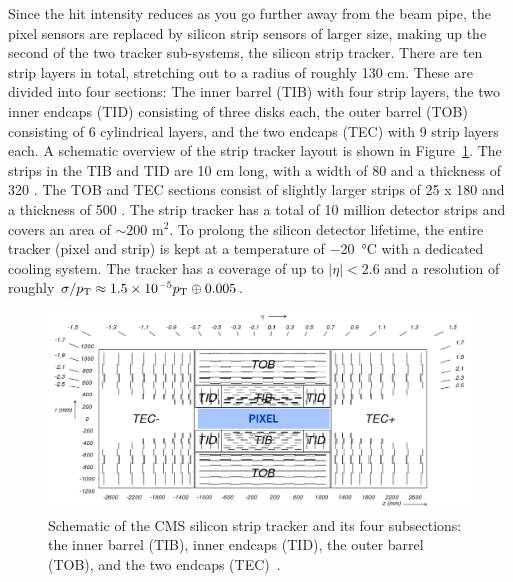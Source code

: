 Since the hit intensity reduces as you go further away from the beam pipe, the pixel sensors are replaced by silicon strip sensors of larger size, making up the second of the two tracker sub-systems, the silicon strip tracker. There are ten strip layers in total, stretching out to a radius of roughly 130 cm. These are divided into four sections: The inner barrel (TIB) with four strip layers, the two inner endcaps (TID) consisting of three disks each, the outer barrel (TOB) consisting of 6 cylindrical layers, and the two endcaps (TEC) with 9 strip layers each. A schematic overview of the strip tracker layout is shown in Figure~\ref{fig:cms:tracker}.
The strips in the TIB and TID are 10 cm long, with a width of 80 \micron and a thickness of 320 \micron. The TOB and TEC sections consist of slightly larger strips of 25 \cm x 180 \micron and a thickness of 500 \micron. The strip tracker has a total of 10 million detector strips and covers an area of $\sim 200 \textrm{ m}^2$.
To prolong the silicon detector lifetime, the entire tracker (pixel and strip) is kept at a temperature of \SI{-20}{\celsius} with a dedicated cooling system.
The tracker has a coverage of up to $|\eta|<2.6$ and a resolution of roughly $\sigma / p_{\mathrm{T}} \approx 1.5 \times 10^{-5} p_{\mathrm{T}} \oplus 0.005$.
\begin{figure}[h!] 
    \centering
    \includegraphics[width=1.0\textwidth]{figures/cms/fig_cmstracker.png}
    \caption{Schematic of the CMS silicon strip tracker and its four subsections: the inner barrel (TIB), inner endcaps (TID), the outer barrel (TOB), and the two endcaps (TEC)~\cite{Chatrchyan:2008aa}.}
    \label{fig:cms:tracker}
\end{figure}

